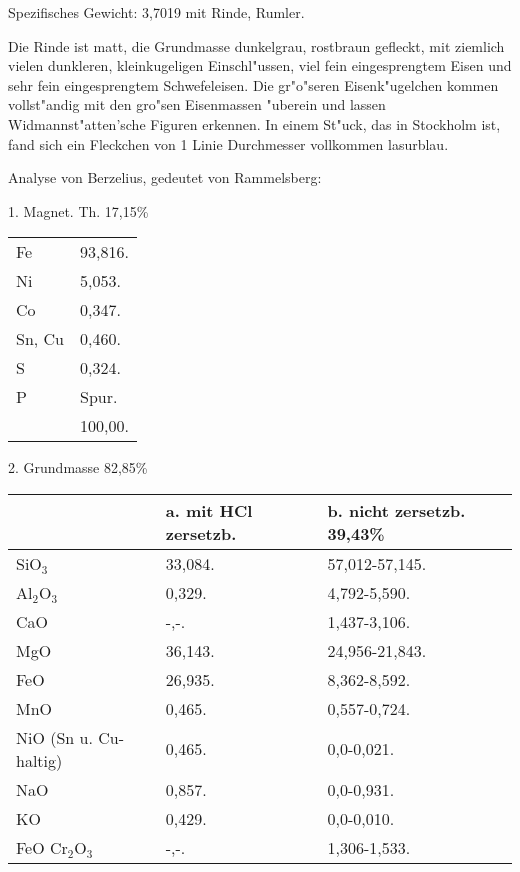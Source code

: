 \documentclass[a4paper, 11pt, oneside]{article}
\begin{document}
Spezifisches Gewicht: 3,7019 mit Rinde, Rumler.

Die Rinde ist matt, die Grundmasse dunkelgrau, rostbraun gefleckt, mit ziemlich vielen dunkleren, kleinkugeligen Einschl"ussen, viel fein eingesprengtem Eisen und sehr fein eingesprengtem Schwefeleisen. Die gr"o"seren Eisenk"ugelchen kommen vollst"andig mit den gro"sen Eisenmassen "uberein und lassen Widmannst"atten'sche Figuren erkennen. In einem St"uck, das in Stockholm ist, fand sich ein Fleckchen von 1 Linie Durchmesser vollkommen lasurblau.

Analyse von Berzelius, gedeutet von Rammelsberg:
\begin{center}
1. Magnet. Th. 17,15\%
\end{center}
\begin{table}[H]
    \centering\swabfamily\Large
    \begin{tabular}{l l}
        Fe & 93,816. \\
        Ni & 5,053. \\
        Co & 0,347. \\
        Sn, Cu & 0,460. \\
        S & 0,324. \\
        P & Spur. \\
         & 100,00. \\
    \end{tabular}
\end{table}
\begin{center}
2. Grundmasse 82,85\%
\end{center}
\begin{table}[H]
    \centering\swabfamily\Large
    \begin{tabular}{l l l}
         & a. mit HCl zersetzb.  & b. nicht zersetzb. 39,43\%  \\ \hline
        SiO$_{3}$ & 33,084. & 57,012-57,145. \\
        Al$_{2}$O$_{3}$ & 0,329. & 4,792-5,590. \\
        CaO & -,-. & 1,437-3,106. \\
        MgO & 36,143. & 24,956-21,843. \\
        FeO & 26,935. & 8,362-8,592. \\
        MnO & 0,465. & 0,557-0,724. \\
        NiO (Sn u. Cu-haltig)  & 0,465. & 0,0-0,021. \\
        NaO & 0,857. & 0,0-0,931. \\
        KO & 0,429. & 0,0-0,010. \\
        FeO Cr$_{2}$O$_{3}$ & -,-. & 1,306-1,533. \\
    \end{tabular}
\end{table}
\end{document}
